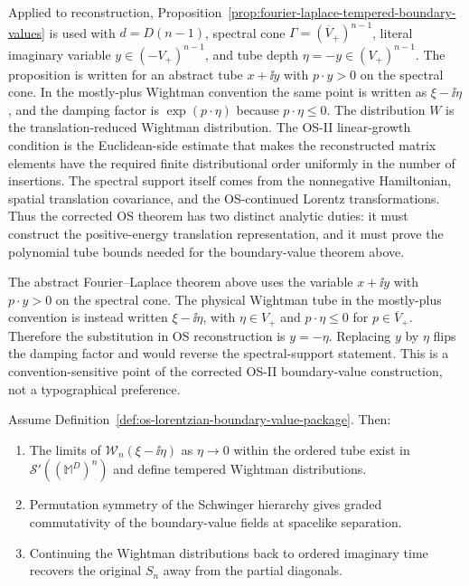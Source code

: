 Applied to reconstruction, Proposition~\ref{prop:fourier-laplace-tempered-boundary-values}
is used with \(d=D(n-1)\), spectral cone
\(\Gamma=(\overline V_+)^{n-1}\), literal imaginary variable
\(y\in(-V_+)^{n-1}\), and tube depth \(\eta=-y\in(V_+)^{n-1}\).  The
proposition is written for an abstract tube \(x+\ii y\) with
\(p\cdot y>0\) on the spectral cone.  In the mostly-plus Wightman convention
the same point is written as \(\xi-\ii\eta\), and the damping factor is
\(\exp(p\cdot\eta)\) because \(p\cdot\eta\le0\).  The distribution \(W\) is
the translation-reduced Wightman distribution.  The OS-II linear-growth
condition is the Euclidean-side estimate that makes the reconstructed
matrix elements have the required finite distributional order uniformly in
the number of insertions.  The spectral support itself comes from the
nonnegative Hamiltonian, spatial translation covariance, and the
OS-continued Lorentz transformations.  Thus the corrected OS theorem has two
distinct analytic duties: it must construct the positive-energy translation
representation, and it must prove the polynomial tube bounds needed for the
boundary-value theorem above.

\begin{warning}
The abstract Fourier--Laplace theorem above uses the variable \(x+\ii y\)
with \(p\cdot y>0\) on the spectral cone.  The physical Wightman tube in the
mostly-plus convention is instead written \(\xi-\ii\eta\), with
\(\eta\in V_+\) and \(p\cdot\eta\le0\) for \(p\in\overline V_+\).  Therefore
the substitution in OS reconstruction is \(y=-\eta\).  Replacing \(y\) by
\(\eta\) flips the damping factor and would reverse the spectral-support
statement.  This is a convention-sensitive point of the corrected OS-II
boundary-value construction, not a typographical preference.
\end{warning}

\begin{proposition}
\label{prop:os-boundary-package-consequences}
Assume Definition~\ref{def:os-lorentzian-boundary-value-package}.  Then:
\begin{enumerate}[label=(\alph*)]
\item The limits of \(\mathcal W_n(\xi-\ii\eta)\) as
\(\eta\to0\) within the ordered tube exist in
\(\mathcal S'((\mathbb M^D)^n)\) and define tempered Wightman distributions.
\item Permutation symmetry of the Schwinger hierarchy gives graded
commutativity of the boundary-value fields at spacelike separation.
\item Continuing the Wightman distributions back to ordered imaginary time
recovers the original \(S_n\) away from the partial diagonals.
\end{enumerate}
\end{proposition}

